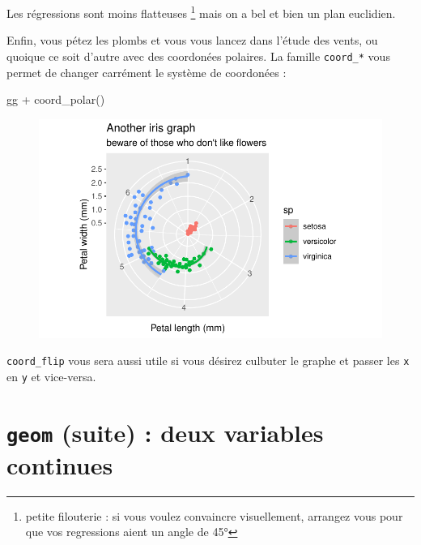 \documentclass[
  letterpaper,
  DIV=11,
  numbers=noendperiod]{scrreprt}
\newenvironment{Shaded}{\begin{snugshade}}{\end{snugshade}}
\newcommand{\FunctionTok}[1]{\textcolor[rgb]{0.28,0.35,0.67}{#1}}
\newcommand{\NormalTok}[1]{\textcolor[rgb]{0.00,0.23,0.31}{#1}}
\newcommand{\SpecialCharTok}[1]{\textcolor[rgb]{0.37,0.37,0.37}{#1}}
\begin{document}
Les régressions sont moins flatteuses \footnote{petite filouterie : si
  vous voulez convaincre visuellement, arrangez vous pour que vos
  regressions aient un angle de 45°} mais on a bel et bien un plan
euclidien.

Enfin, vous pétez les plombs et vous vous lancez dans l'étude des vents,
ou quoique ce soit d'autre avec des coordonées polaires. La famille
\texttt{coord\_*} vous permet de changer carrément le système de
coordonées :

\begin{Shaded}
\begin{Highlighting}[]
\NormalTok{gg }\SpecialCharTok{+} \FunctionTok{coord\_polar}\NormalTok{()}
\end{Highlighting}
\end{Shaded}

\begin{figure}[H]

{\centering \includegraphics{ggplot2_files/figure-pdf/unnamed-chunk-21-1.pdf}

}

\end{figure}

\texttt{coord\_flip} vous sera aussi utile si vous désirez culbuter le
graphe et passer les \texttt{x} en \texttt{y} et vice-versa.

\hypertarget{geom-suite-deux-variables-continues}{%
\section{\texorpdfstring{\texttt{geom} (suite) : deux variables
continues}{geom (suite) : deux variables continues}}\label{geom-suite-deux-variables-continues}}
\end{document}
